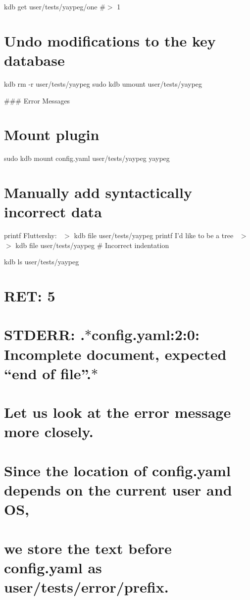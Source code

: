 kdb get user/tests/yaypeg/one \#$>$ 1

\section*{Undo modifications to the key database}

kdb rm -\/r user/tests/yaypeg sudo kdb umount user/tests/yaypeg 
\begin{DoxyCode}
### Error Messages
\end{DoxyCode}
 \section*{Mount plugin}

sudo kdb mount config.\+yaml user/tests/yaypeg yaypeg

\section*{Manually add syntactically incorrect data}

printf \textquotesingle{}Fluttershy\+:~\newline
\textquotesingle{} $>$ {\ttfamily kdb file user/tests/yaypeg} printf \textquotesingle{}I’d like to be a tree~\newline
\textquotesingle{} $>$$>$ {\ttfamily kdb file user/tests/yaypeg} \# Incorrect indentation

kdb ls user/tests/yaypeg \section*{R\+ET\+: 5}

\section*{S\+T\+D\+E\+RR\+: .$\ast$config.yaml\+:2\+:0\+: Incomplete document, expected “end of file”.$\ast$}

\section*{Let us look at the error message more closely.}

\section*{Since the location of {\ttfamily config.\+yaml} depends on the current user and OS,}

\section*{we store the text before {\ttfamily config.\+yaml} as {\ttfamily user/tests/error/prefix}.}

